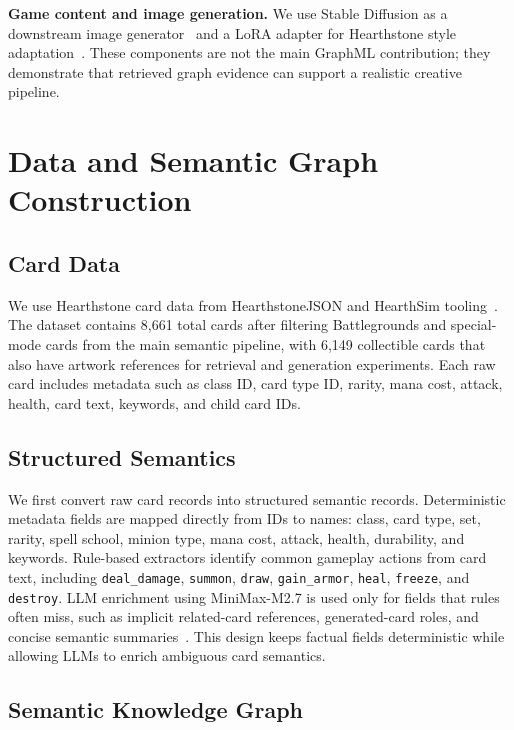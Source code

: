 \documentclass{article}
\begin{document}
\textbf{Game content and image generation.} We use Stable Diffusion as a downstream image generator~\citep{rombach2022ldm} and a LoRA adapter for Hearthstone style adaptation~\citep{hu2021lora}. These components are not the main GraphML contribution; they demonstrate that retrieved graph evidence can support a realistic creative pipeline.

\section{Data and Semantic Graph Construction}

\subsection{Card Data}

We use Hearthstone card data from HearthstoneJSON and HearthSim tooling~\citep{hearthstonejson,hearthsim}. The dataset contains 8,661 total cards after filtering Battlegrounds and special-mode cards from the main semantic pipeline, with 6,149 collectible cards that also have artwork references for retrieval and generation experiments. Each raw card includes metadata such as class ID, card type ID, rarity, mana cost, attack, health, card text, keywords, and child card IDs.

\subsection{Structured Semantics}

We first convert raw card records into structured semantic records. Deterministic metadata fields are mapped directly from IDs to names: class, card type, set, rarity, spell school, minion type, mana cost, attack, health, durability, and keywords. Rule-based extractors identify common gameplay actions from card text, including \texttt{deal\_damage}, \texttt{summon}, \texttt{draw}, \texttt{gain\_armor}, \texttt{heal}, \texttt{freeze}, and \texttt{destroy}. LLM enrichment using MiniMax-M2.7 is used only for fields that rules often miss, such as implicit related-card references, generated-card roles, and concise semantic summaries~\citep{minimaxm27}. This design keeps factual fields deterministic while allowing LLMs to enrich ambiguous card semantics.

\subsection{Semantic Knowledge Graph}
\end{document}

